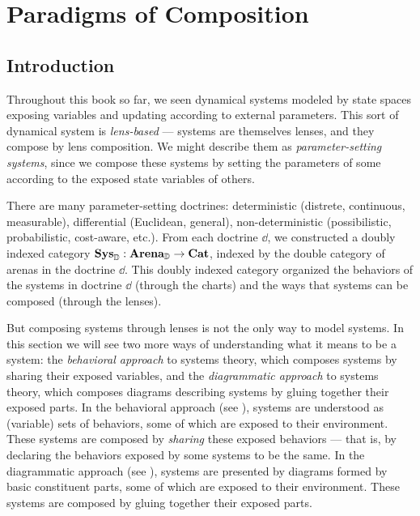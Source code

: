 \documentclass[DynamicalBook]{subfiles}
\begin{document}
%


\setcounter{chapter}{5}%

\chapter{Paradigms of Composition}\label{chapter.6} 

\section{Introduction}


Throughout this book so far, we seen dynamical systems modeled by state spaces exposing
variables and updating according to external parameters. This sort of dynamical
system is \emph{lens-based} --- systems are themselves lenses, and they compose by
lens composition. We might describe them as \emph{parameter-setting systems},
since we compose these systems by setting the parameters of some according to
the exposed state variables of others.

There are many parameter-setting doctrines: deterministic (distrete, continuous, measurable), differential (Euclidean, general), non-deterministic (possibilistic, probabilistic, cost-aware, etc.). From each doctrine $\dd$, we constructed a doubly indexed category $\textbf{Sys}_{\mathbb{D}} : \textbf{Arena}_{\mathbb{D}} \to \textbf{Cat}$, indexed by the double category of arenas in the doctrine $\dd$. This doubly indexed category organized the behaviors of the systems in doctrine $\dd$ (through the charts) and the ways that systems can be composed (through the lenses).

But composing systems through lenses is not the only way to model systems. In this section we will see two more ways of understanding what it means to be a system: the \emph{behavioral approach} to systems theory, which composes systems by sharing their exposed variables, and the \emph{diagrammatic approach} to systems theory, which composes diagrams describing systems by gluing together their exposed parts. In the behavioral approach (see \cite{sec:behavioral.approach}), systems are understood as (variable) sets of behaviors, some of which are exposed to their environment. These systems are composed by \emph{sharing} these exposed behaviors --- that is, by declaring the behaviors exposed by some systems to be the same. In the diagrammatic approach (see \cite{sec:diagram.approach}), systems are presented by diagrams formed by basic constituent parts, some of which are exposed to their environment. These systems are composed by gluing together their exposed parts.
\end{document}
